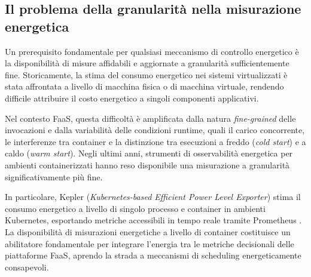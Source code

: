 \subsection{Il problema della granularità nella misurazione energetica}

Un prerequisito fondamentale per qualsiasi meccanismo di controllo
energetico è la disponibilità di misure affidabili e aggiornate a
granularità sufficientemente fine. Storicamente, la stima del consumo
energetico nei sistemi virtualizzati è stata affrontata a livello
di macchina fisica o di macchina virtuale, rendendo difficile
attribuire il costo energetico a singoli componenti applicativi.

Nel contesto FaaS, questa difficoltà è amplificata dalla natura
\emph{fine-grained} delle invocazioni e dalla variabilità delle
condizioni runtime, quali il carico concorrente, le interferenze
tra container e la distinzione tra esecuzioni a freddo
(\emph{cold start}) e a caldo (\emph{warm start}).
Negli ultimi anni, strumenti di osservabilità energetica per ambienti
containerizzati hanno reso disponibile una misurazione a granularità
significativamente più fine.

In particolare, Kepler (\emph{Kubernetes-based Efficient Power Level
Exporter}) stima il consumo energetico a livello di singolo processo
e container in ambienti Kubernetes, esportando metriche accessibili
in tempo reale tramite Prometheus \cite{Amaral2023_Kepler}.
La disponibilità di misurazioni energetiche a livello di container
costituisce un abilitatore fondamentale per integrare l'energia tra
le metriche decisionali delle piattaforme FaaS, aprendo la strada
a meccanismi di scheduling energeticamente consapevoli.
